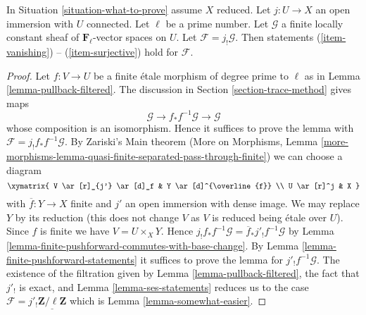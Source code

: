 \begin{lemma}
\label{lemma-vanishing-easier}
In Situation \ref{situation-what-to-prove} assume $X$ reduced.
Let $j : U \to X$ an open immersion with $U$ connected. Let
$\ell$ be a prime number. Let $\mathcal{G}$ a finite locally
constant sheaf of $\mathbf{F}_\ell$-vector spaces on $U$. Let
$\mathcal{F} = j_!\mathcal{G}$. Then statements
(\ref{item-vanishing}) -- (\ref{item-surjective}) hold for $\mathcal{F}$.
\end{lemma}

\begin{proof}
Let $f : V \to U$ be a finite \'etale morphism of degree prime to $\ell$
as in Lemma \ref{lemma-pullback-filtered}. The discussion in
Section \ref{section-trace-method} gives maps
$$
\mathcal{G} \to f_*f^{-1}\mathcal{G} \to \mathcal{G}
$$
whose composition is an isomorphism. Hence it suffices to prove the
lemma with $\mathcal{F} = j_!f_*f^{-1}\mathcal{G}$.
By Zariski's Main theorem
(More on Morphisms, Lemma
\ref{more-morphisms-lemma-quasi-finite-separated-pass-through-finite})
we can choose a diagram
$$
\xymatrix{
V \ar[r]_{j'} \ar[d]_f & Y \ar[d]^{\overline{f}} \\
U \ar[r]^j & X
}
$$
with $\overline{f} : Y \to X$ finite and $j'$ an open immersion
with dense image. We may replace $Y$ by its reduction (this does
not change $V$ as $V$ is reduced being \'etale over $U$).
Since $f$ is finite we have $V = U \times_X Y$. Hence
$j_!f_*f^{-1}\mathcal{G} = \overline{f}_*j'_!f^{-1}\mathcal{G}$ by
Lemma \ref{lemma-finite-pushforward-commutes-with-base-change}.
By Lemma \ref{lemma-finite-pushforward-statements} it suffices to
prove the lemma for $j'_!f^{-1}\mathcal{G}$.
The existence of the filtration given by
Lemma \ref{lemma-pullback-filtered},
the fact that $j'_!$ is exact, and
Lemma \ref{lemma-ses-statements}
reduces us to the case
$\mathcal{F} = j'_!\underline{\mathbf{Z}/\ell\mathbf{Z}}$
which is Lemma \ref{lemma-somewhat-easier}.
\end{proof}



